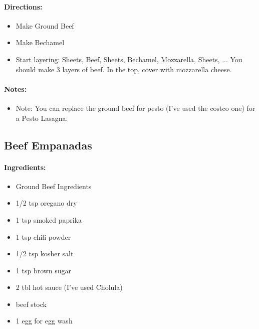 \documentclass{article}
\begin{document}
\paragraph{Directions:}
\begin{itemize}
    \item Make Ground Beef
    \item Make Bechamel
    \item Start layering: Sheets, Beef, Sheets, Bechamel, Mozzarella, Sheets, ... You should make 3 layers of beef. In the top, cover with mozzarella cheese.
\end{itemize}

\paragraph{Notes:}
\begin{itemize}
    \item Note: You can replace the ground beef for pesto (I’ve used the costco one) for a Pesto Lasagna.
\end{itemize}

\subsection{Beef Empanadas}

\paragraph{Ingredients:}
\begin{itemize}
    \item Ground Beef Ingredients
    \item 1/2 tsp oregano dry
    \item 1 tsp smoked paprika
    \item 1 tsp chili powder
    \item 1/2 tsp kosher salt
    \item 1 tsp brown sugar
    \item 2 tbl hot sauce (I’ve used Cholula)
    \item beef stock
    \item 1 egg for egg wash
\end{itemize}
\end{document}
